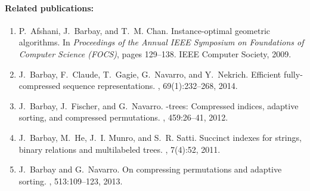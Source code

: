 \documentclass[a4paper,10pt]{article}
\begin{document}
\paragraph{Related publications:}
\begin{enumerate}
\item
P.~Afshani, J.~Barbay, and T.~M. Chan.
\newblock Instance-optimal geometric algorithms.
\newblock In {\em Proceedings of the Annual IEEE Symposium on Foundations of
  Computer Science (FOCS)}, pages 129--138. IEEE Computer Society, 2009.

\item
J.~Barbay, F.~Claude, T.~Gagie, G.~Navarro, and Y.~Nekrich.
\newblock Efficient fully-compressed sequence representations.
, 69(1):232--268, 2014.

\item
J.~Barbay, J.~Fischer, and G.~Navarro.
-trees: Compressed indices, adaptive sorting, and compressed
  permutations.
, 459:26--41,
  2012.

\item
J.~Barbay, M.~He, J.~I. Munro, and S.~R. Satti.
\newblock Succinct indexes for strings, binary relations and multilabeled
  trees.
 , 7(4):52, 2011.

\item
J.~Barbay and G.~Navarro.
\newblock On compressing permutations and adaptive sorting.
, 513:109--123, 2013.
\end{enumerate}


\end{document}

